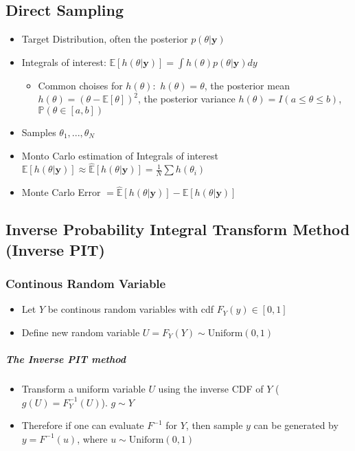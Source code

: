 \documentclass[12pt]{article}
\theoremstyle{definition}
\newcommand{\Prob}[1]{\mathbb{P}(#1)}
\newcommand{\Expect}[1]{\mathbb{E}\left[#1\right]}
\newcommand{\MonteCarlo}[1]{\hat{\mathbb{E}}\left[#1\right]}
\begin{document}
\subsection*{Direct Sampling}
\begin{itemize}
    \item Target Distribution, often the posterior $p(\theta|\bm{y})$
    \item Integrals of interest: $\Expect{h(\theta|\bm{y})} = \int h(\theta)p(\theta|\bm{y}) dy$
    \begin{itemize}[topsep = 0pt]
        \item Common choises for $h(\theta):$
         \subitem $h(\theta) = \theta$, the posterior mean
         \subitem $h(\theta) = (\theta - \Expect{\theta})^2$, the posterior variance
         \subitem $h(\theta) = I(a \leq \theta \leq b)$, $\Prob{\theta \in [a,b]}$
    \end{itemize}
    \item Samples $\theta_1,...,\theta_N$
    \item Monto Carlo estimation of Integrals of interest $\Expect{h(\theta| \bm{y})} \approx \MonteCarlo{h(\theta| \bm{y})} = \frac{1}{N}\sum h(\theta_i)$
    \item Monte Carlo Error $= \MonteCarlo{h(\theta|\bm{y})} - \Expect{h(\theta|\bm{y})}$ 
\end{itemize}

\subsection*{Inverse Probability Integral Transform Method (Inverse PIT)}
\subsubsection*{Continous Random Variable}
    \begin{itemize}
        \item Let $Y$ be continous random variables with cdf $F_Y(y) \in  [0,1]$
        \item Define new random variable $U = F_Y(Y) \sim \text{Uniform}(0,1)$
    \end{itemize}
    \subparagraph*{The Inverse PIT method}
    \begin{itemize}
        \item Transform a uniform variable $U$ using the inverse CDF of $Y$ ($g(U) = F_Y^{-1}(U)$). $g \sim Y$
        \item Therefore if one can evaluate $F^{-1}$ for $Y$, then sample $y$ can be generated by $y = F^{-1}(u)$, where $u \sim \text{Uniform}(0,1)$
    \end{itemize}
\end{document}
